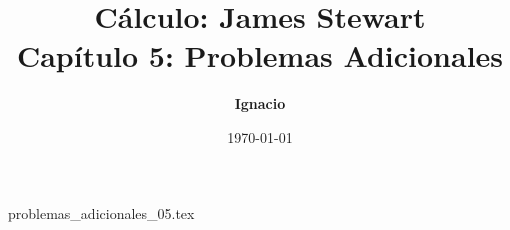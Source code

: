 \documentclass[11pt,spanish,oneside]{report}
\title{\textbf{Cálculo: James Stewart} \\ \Large Capítulo 5: Problemas Adicionales}
\author{\textbf{Ignacio}}
\date{\today}
\begin{document}
\maketitle

{problemas_adicionales_05.tex}
\end{document}

